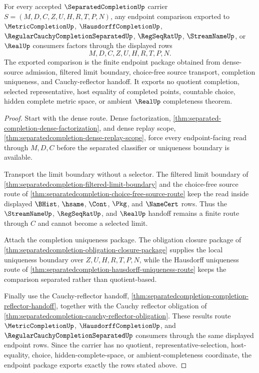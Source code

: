\begin{theorem}
\label{thm:separatedcompletion-choice-free-endpoint-package}
For every accepted $\SeparatedCompletionUp$ carrier $S=(M,D,C,Z,U,H,R,T,P,N)$, any endpoint comparison exported to $\MetricCompletionUp$, $\HausdorffCompletionUp$, $\RegularCauchyCompletionSeparatedUp$, $\RegSeqRatUp$, $\StreamNameUp$, or $\RealUp$ consumers factors through the displayed rows
$$
M,D,C,Z,U,H,R,T,P,N .
$$
The exported comparison is the finite endpoint package obtained from dense-source admission, filtered limit boundary, choice-free source transport, completion uniqueness, and Cauchy-reflector handoff. It exports no quotient completion, selected representative, host equality of completed points, countable choice, hidden complete metric space, or ambient $\RealUp$ completeness theorem.
\end{theorem}
\begin{proof}
Start with the dense route. Dense factorization, \autoref{thm:separated-completion-dense-factorization}, and dense replay scope, \autoref{thm:separatedcompletion-dense-replay-scope}, force every endpoint-facing read through $M,D,C$ before the separated classifier or uniqueness boundary is available.

Transport the limit boundary without a selector. The filtered limit boundary of \autoref{thm:separatedcompletion-filtered-limit-boundary} and the choice-free source route of \autoref{thm:separatedcompletion-choice-free-source-route} keep the read inside displayed $\BHist$, $\hsame$, $\Cont$, $\Pkg$, and $\NameCert$ rows. Thus the $\StreamNameUp$, $\RegSeqRatUp$, and $\RealUp$ handoff remains a finite route through $C$ and cannot become a selected limit.

Attach the completion uniqueness package. The obligation closure package of \autoref{thm:separatedcompletion-obligation-closure-package} supplies the local uniqueness boundary over $Z,U,H,R,T,P,N$, while the Hausdorff uniqueness route of \autoref{thm:separatedcompletion-hausdorff-uniqueness-route} keeps the comparison separated rather than quotient-based.

Finally use the Cauchy-reflector handoff, \autoref{thm:separatedcompletion-completion-reflector-handoff}, together with the Cauchy reflector obligation of \autoref{thm:separatedcompletion-cauchy-reflector-obligation}. These results route $\MetricCompletionUp$, $\HausdorffCompletionUp$, and $\RegularCauchyCompletionSeparatedUp$ consumers through the same displayed endpoint rows. Since the carrier has no quotient, representative-selection, host-equality, choice, hidden-complete-space, or ambient-completeness coordinate, the endpoint package exports exactly the rows stated above.
\end{proof}

